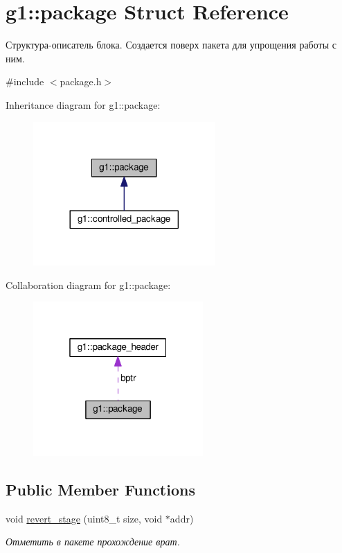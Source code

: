 \hypertarget{structg1_1_1package}{}\section{g1\+:\+:package Struct Reference}
\label{structg1_1_1package}


Структура-\/описатель блока. Создается поверх пакета для упрощения работы с ним.  




{\ttfamily \#include $<$package.\+h$>$}



Inheritance diagram for g1\+:\+:package\+:
\nopagebreak
\begin{figure}[H]
\begin{center}
\leavevmode
\includegraphics[width=197pt]{structg1_1_1package__inherit__graph}
\end{center}
\end{figure}


Collaboration diagram for g1\+:\+:package\+:\nopagebreak
\begin{figure}[H]
\begin{center}
\leavevmode
\includegraphics[width=184pt]{structg1_1_1package__coll__graph}
\end{center}
\end{figure}
\subsection*{Public Member Functions}
\begin{DoxyCompactItemize}
\item 
void \hyperlink{structg1_1_1package_a667ed03d442d2c9cfe28917c75525e4e}{revert\+\_\+stage} (uint8\+\_\+t size, void $\ast$addr)\hypertarget{structg1_1_1package_a667ed03d442d2c9cfe28917c75525e4e}{}\label{structg1_1_1package_a667ed03d442d2c9cfe28917c75525e4e}

\begin{DoxyCompactList}\small\item\em Отметить в пакете прохождение врат. \end{DoxyCompactList}\end{DoxyCompactItemize}
